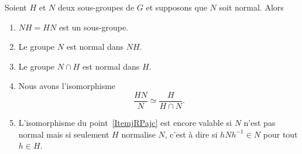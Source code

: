 \begin{theorem}
    Soient \( H\) et \( N\) deux sous-groupes de \( G\) et supposons que \( N\) soit normal. Alors
    \begin{enumerate}
        \item
            \( NH=HN\) est un sous-groupe.
        \item
            Le groupe \( N\) est normal dans \( NH\).
        \item
            Le groupe \( N\cap H\) est normal dans \( H\).

        \item\label{ItemjRPajc}
            Nous avons l'isomorphisme
            \begin{equation}
                \frac{ HN }{ N }\simeq\frac{ H }{ H\cap N }.
            \end{equation}
        \item   \label{ItembgDQEN}
            L'isomorphisme du point~\ref{ItemjRPajc} est encore valable si \( N\) n'est pas normal mais si seulement \( H\) normalise \( N\), c'est à dire si \( hNh^{-1}\in N\) pour tout \( h\in H\).
    \end{enumerate}
\end{theorem}


